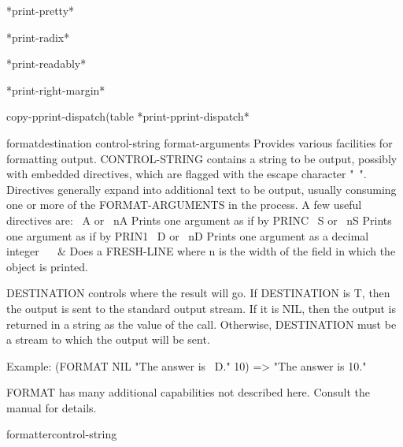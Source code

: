\begin{variable}{*print-pretty*}{}{}
  
\end{variable}

\begin{variable}{*print-radix*}{}{}
  
\end{variable}

\begin{variable}{*print-readably*}{}{}
  
\end{variable}

\begin{variable}{*print-right-margin*}{}{}
  
\end{variable}

\begin{function}{copy-pprint-dispatch}{\op (table *print-pprint-dispatch*}{}
  
\end{function}

\begin{function}{format}{destination control-string \rest format-arguments}{}
  Provides various facilities for formatting output.
  CONTROL-STRING contains a string to be output, possibly with embedded
  directives, which are flagged with the escape character "~". Directives
  generally expand into additional text to be output, usually consuming one
  or more of the FORMAT-ARGUMENTS in the process. A few useful directives
  are:
        ~A or ~nA   Prints one argument as if by PRINC
        ~S or ~nS   Prints one argument as if by PRIN1
        ~D or ~nD   Prints one argument as a decimal integer
        ~%
        ~&          Does a FRESH-LINE
  where n is the width of the field in which the object is printed.

  DESTINATION controls where the result will go. If DESTINATION is T, then
  the output is sent to the standard output stream. If it is NIL, then the
  output is returned in a string as the value of the call. Otherwise,
  DESTINATION must be a stream to which the output will be sent.

  Example:   (FORMAT NIL "The answer is ~D." 10) => "The answer is 10."

  FORMAT has many additional capabilities not described here. Consult the
  manual for details.
\end{function}

\begin{macro}{formatter}{control-string}{}
  
\end{macro}

